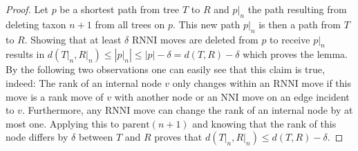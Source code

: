\documentclass{amsart}
\newcommand{\parent}{\mathrm{parent}}
\newcommand{\nni}{\mathrm{NNI}}
\newcommand{\rnni}{\mathrm{RNNI}}
\begin{document}
\begin{proof}
    Let $p$ be a shortest path from tree $T$ to $R$ and $p{\big|}_n$ the path resulting from deleting taxon $n+1$ from all trees on $p$.
    This new path $p{\big|}_n$ is then a path from $T$ to $R$.
    Showing that at least $\delta$ $\rnni$ moves are deleted from $p$ to receive $p{\big|}_n$ results in $d(T{\big|}_n,R{\big|}_n) \leq |p{\big|}_n| \leq |p| - \delta = d(T,R) -\delta$ which proves the lemma.
    By the following two observations one can easily see that this claim is true, indeed:
    The rank of an internal node $v$ only changes within an $\rnni$ move if this move is a rank move of $v$ with another node or an $\nni$ move on an edge incident to $v$.
    Furthermore, any $\rnni$ move can change the rank of an internal node by at most one.
    Applying this to $\parent(n+1)$ and knowing that the rank of this node differs by $\delta$ between $T$ and $R$ proves that $d(T{\big|}_n, R{\big|}_n) \leq d(T,R) - \delta$.


\end{proof}
\end{document}
